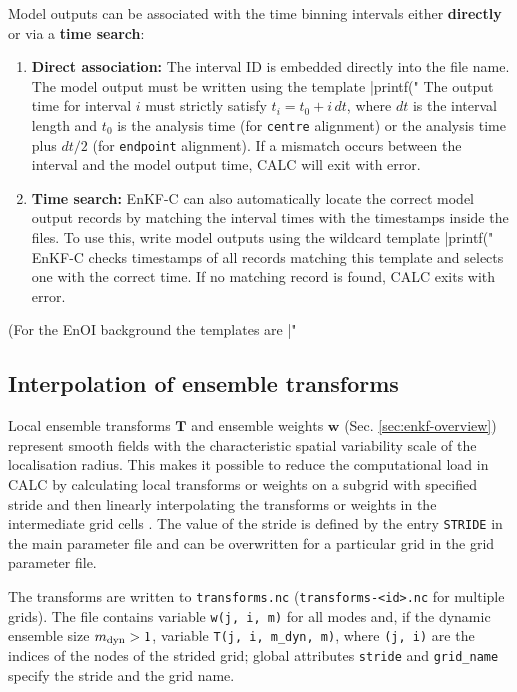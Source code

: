 \documentclass[11pt]{report}
\newcommand{\mb} {\mathbf}
\newcommand*\subtxt[1]{_{\textnormal{#1}}}
\begin{document}
Model outputs can be associated with the time binning intervals either {\bf directly} or via a {\bf time search}:
\begin{enumerate}
\item {\bf Direct association:} The interval ID is embedded directly into the file name. The model output must be written using the template \spverb|printf("%
The output time for interval $i$ must strictly satisfy $t_i = t_0 + i \, dt$, where $dt$ is the interval length and $t_0$ is the analysis time (for \verb|centre| alignment) or the analysis time plus $dt/2$ (for \verb|endpoint| alignment).
If a mismatch occurs between the interval and the model output time, CALC will exit with error.
\item {\bf Time search:} EnKF-C can also automatically locate the correct model output records by matching the interval times with the timestamps inside the files. To use this, write model outputs using the wildcard template \spverb|printf("%
EnKF-C checks timestamps of all records matching this template and selects one with the correct time.
If no matching record is found, CALC exits with error.
\end{enumerate}
(For the EnOI background the templates are \spverb|"%

\subsection{Interpolation of ensemble transforms}

Local ensemble transforms $\mb T$ and ensemble weights $\mb w$ (Sec. \ref{sec:enkf-overview}) represent smooth fields with the characteristic spatial variability scale of the localisation radius.
This makes it possible to reduce the computational load in CALC by calculating local transforms or weights on a subgrid with specified stride and then linearly interpolating the transforms or weights in the intermediate grid cells \citep{yan09a}.
The value of the stride is defined by the entry \verb|STRIDE| in the main parameter file and can be overwritten for a particular grid in the grid parameter file.

The transforms are written to \verb|transforms.nc| (\verb|transforms-<id>.nc| for multiple grids).
The file contains variable \verb|w(j, i, m)| for all modes and, if the dynamic ensemble size $m\subtxt{dyn} > 1$, variable \verb|T(j, i, m_dyn, m)|, where \verb|(j, i)| are the indices of the nodes of the strided grid; global attributes \verb|stride| and \verb|grid_name| specify the stride and the grid name.
\end{document}
